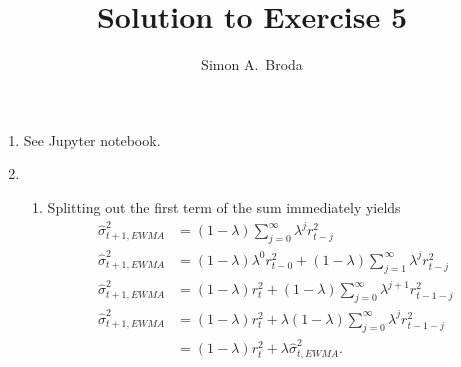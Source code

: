 \documentclass[11pt, a4paper]{article}
\begin{document}
\title{Solution to Exercise 5}
\author{Simon A.\ Broda}
\date{}
\maketitle

\begin{enumerate}


\item See Jupyter notebook.
\item
\begin{enumerate}
\item Splitting out the first term of the sum immediately yields
\begin{align*}
 \widehat{\sigma}_{t+1,EWMA}^{2}  &=(1-\lambda )\sum_{j=0}^{\infty }\lambda ^{j}r_{t-j}^{2} \\
 \widehat{\sigma}_{t+1,EWMA}^{2}  &=(1-\lambda ) \lambda^0 r_{t-0}^2+(1-\lambda )\sum_{j=1}^{\infty }\lambda ^{j}r_{t-j}^{2} \\
 \widehat{\sigma}_{t+1,EWMA}^{2}  &=(1-\lambda ) r_{t}^2+(1-\lambda )\sum_{j=0}^{\infty }\lambda ^{j+1}r_{t-1-j}^{2} \\
 \widehat{\sigma}_{t+1,EWMA}^{2}  &=(1-\lambda ) r_{t}^2+\lambda(1-\lambda )\sum_{j=0}^{\infty }\lambda ^{j}r_{t-1-j}^{2} \\
&=(1-\lambda )r_{t}^{2}+\lambda\widehat{\sigma}_{t,EWMA}^{2}.
\end{align*}

\end{enumerate}
\end{enumerate}
\end{document}
